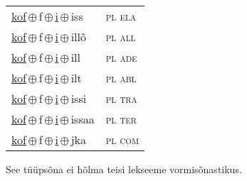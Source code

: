 \begin{minipage}{\textwidth}
\begin{sideways}
\begin{tabular}{l l}
\underline{kof}\,$\oplus$\,f\,$\oplus$\,\underline{i}\,$\oplus$\,iss & \textsc{ pl ela } \\
\underline{kof}\,$\oplus$\,f\,$\oplus$\,\underline{i}\,$\oplus$\,illõ & \textsc{ pl all } \\
\underline{kof}\,$\oplus$\,f\,$\oplus$\,\underline{i}\,$\oplus$\,ill & \textsc{ pl ade } \\
\underline{kof}\,$\oplus$\,f\,$\oplus$\,\underline{i}\,$\oplus$\,ilt & \textsc{ pl abl } \\
\underline{kof}\,$\oplus$\,f\,$\oplus$\,\underline{i}\,$\oplus$\,issi & \textsc{ pl tra } \\
\underline{kof}\,$\oplus$\,f\,$\oplus$\,\underline{i}\,$\oplus$\,issaa & \textsc{ pl ter } \\
\underline{kof}\,$\oplus$\,f\,$\oplus$\,\underline{i}\,$\oplus$\,jka & \textsc{ pl com } \\
\end{tabular}
\end{sideways}
\label{tab:tüüpsõnamall-koffi}

\end{minipage}

 
\vspace{1em}
\noindent See tüüpsõna ei hõlma teisi lekseeme vormi\-sõnastikus.
